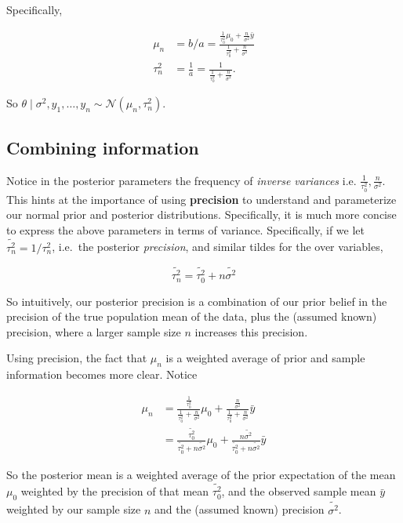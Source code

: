 \documentclass[]{article}
\begin{document}
Specifically,

\begin{align}
\mu_n &= b/a = \frac{\frac{1}{\tau_0^2} \mu_0 + \frac{n}{\sigma^2}\bar{y}}{\frac{1}{\tau_0^2} + \frac{n}{\sigma^2}} \\
\tau_n^2 &= \frac{1}{a} = \frac{1}{\frac{1}{\tau_0^2} + \frac{n}{\sigma^2}}.
\end{align}

So
\(\theta \mid \sigma^2, y_1, \dots, y_n \sim \mathcal{N}(\mu_n, \tau_n^2)\).

\hypertarget{combining-information}{%
\subsection{Combining information}\label{combining-information}}

Notice in the posterior parameters the frequency of \emph{inverse
variances} i.e. \(\frac{1}{\tau_0^2}, \frac{n}{\sigma^2}\). This hints
at the importance of using \textbf{precision} to understand and
parameterize our normal prior and posterior distributions. Specifically,
it is much more concise to express the above parameters in terms of
variance. Specifically, if we let \(\tilde{\tau_n^2} = 1 / \tau_n^2\),
i.e.~the posterior \emph{precision}, and similar tildes for the over
variables,

\[\tilde{\tau_n^2} = \tilde{\tau_0^2} + n\tilde{\sigma^2}\]

So intuitively, our posterior precision is a combination of our prior
belief in the precision of the true population mean of the data, plus
the (assumed known) precision, where a larger sample size \(n\)
increases this precision.

Using precision, the fact that \(\mu_n\) is a weighted average of prior
and sample information becomes more clear. Notice

\begin{align}
\mu_n &= \frac{\frac{1}{\tau_0^2}}{ \frac{1}{\tau_0^2} + \frac{n}{\sigma^2} } \mu_0 + 
\frac{\frac{n}{\sigma^2}}{ \frac{1}{\tau_0^2} + \frac{n}{\sigma^2} } \bar{y} \\
&= \frac{\tilde{\tau_0^2}}{\tilde{\tau_0^2} + n\tilde{\sigma^2}} \mu_0 + \frac{n\tilde{\sigma^2}}{\tilde{\tau_0^2} + n\tilde{\sigma^2}} \bar{y}
\end{align}

So the posterior mean is a weighted average of the prior expectation of
the mean \(\mu_0\) weighted by the precision of that mean
\(\tilde{\tau_0^2}\), and the observed sample mean \(\bar{y}\) weighted
by our sample size \(n\) and the (assumed known) precision
\(\tilde{\sigma^2}\).
\end{document}
